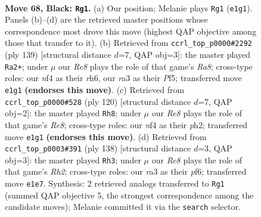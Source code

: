 \documentclass[11pt]{article}
\begin{document}
\clearpage

\begin{figure}[p]\centering
\begin{subfigure}{0.46\textwidth}\centering
\resizebox{\linewidth}{!}{%
\newchessgame
\chessboard[
  setfen={8/8/8/1k6/5N2/R7/2K3P1/4r3 b - - 1 68},
  showmover=false,
  pgfstyle=straightmove, color=movearrow, markmove={e1-g1}
]}
\caption{}
\end{subfigure}\hfill
\begin{subfigure}{0.46\textwidth}\centering
\resizebox{\linewidth}{!}{%
\newchessgame
\chessboard[
  setfen={8/8/7R/5p2/7P/5k2/3K4/r7 b - - 2 70},
  showmover=false,
  pgfstyle=straightmove, color=movearrow, markmove={a1-a2}
]}
\caption{}
\end{subfigure}
\\[4pt]
\begin{subfigure}{0.46\textwidth}\centering
\resizebox{\linewidth}{!}{%
\newchessgame
\chessboard[
  setfen={4R3/8/8/6P1/3k4/5K2/r6p/8 w - - 2 61},
  showmover=false,
  pgfstyle=straightmove, color=movearrow, markmove={e8-h8}
]}
\caption{}
\end{subfigure}\hfill
\begin{subfigure}{0.46\textwidth}\centering
\resizebox{\linewidth}{!}{%
\newchessgame
\chessboard[
  setfen={8/8/5p2/8/4p3/6n1/7R/2K1k3 w - - 16 70},
  showmover=false,
  pgfstyle=straightmove, color=movearrow, markmove={h2-h3}
]}
\caption{}
\end{subfigure}
\caption{\textbf{Move 68, Black: \texttt{Rg1}.} (a) Our position; Melanie plays \texttt{Rg1} (\texttt{e1g1}). Panels (b)--(d) are the retrieved master positions whose correspondence most drove this move (highest QAP objective among those that transfer to it). (b) Retrieved from \texttt{ccrl\_top\_p0000\#2292} (ply 139) [structural distance $d$=7, QAP obj=3]: the master played \texttt{Ra2+}; under $\mu$ our \emph{Re8} plays the role of that game's \emph{Ra8}; cross-type roles: our \emph{n}f4 as their \emph{r}h6, our \emph{r}a3 as their \emph{P}f5; transferred move \texttt{e1g1} \textbf{(endorses this move)}. (c) Retrieved from \texttt{ccrl\_top\_p0000\#528} (ply 120) [structural distance $d$=7, QAP obj=2]: the master played \texttt{Rh8}; under $\mu$ our \emph{Re8} plays the role of that game's \emph{Re8}; cross-type roles: our \emph{n}f4 as their \emph{p}h2; transferred move \texttt{e1g1} \textbf{(endorses this move)}. (d) Retrieved from \texttt{ccrl\_top\_p0003\#391} (ply 138) [structural distance $d$=3, QAP obj=3]: the master played \texttt{Rh3}; under $\mu$ our \emph{Re8} plays the role of that game's \emph{Rh2}; cross-type roles: our \emph{r}a3 as their \emph{p}f6; transferred move \texttt{e1e7}. Synthesis: 2 retrieved analogs transferred to \texttt{Rg1} (summed QAP objective 5, the strongest correspondence among the candidate moves); Melanie committed it via the \texttt{search} selector.}
\label{fig:thought-m135}
\end{figure}
\end{document}
